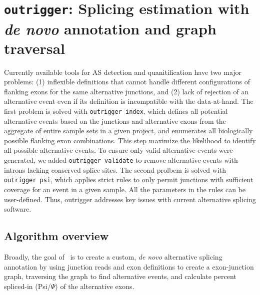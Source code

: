 \section{\texttt{outrigger}: Splicing estimation with \emph{de novo} annotation and graph traversal}
\label{sec:outrigger}

Currently available tools for AS detection and quanitification have two major problems: (1) inflexible definitions that cannot handle different configurations of flanking exons for the same alternative junctions, and (2) lack of rejection of an alternative event even if its definition is incompatible with the data-at-hand. The first problem is solved with \texttt{outrigger index}, which defines all potential alternative events based on the junctions and alternative exons from the aggregate of entire sample sets in a given project, and enumerates all biologically possible flanking exon combinations. This step maximize the likelihood to identify all possible alternative events. To ensure only valid alternative events were generated, we added \texttt{outrigger validate} to remove alternative events with introns lacking conserved splice sites. The second prolbem is solved with \texttt{outrigger psi}, which applies strict rules to only permit junctions with sufficient coverage for an event in a given sample. All the parameters in the rules can be user-defined. Thus, outrigger addresses key issues with current alternative splicing software.

\subsection{Algorithm overview}

Broadly, the goal of \outrigger\, is to create a custom, \emph{de novo} alternative splicing annotation by using junction reads and exon definitions to create a exon-junction graph, traversing the graph to find alternative events, and calculate percent spliced-in (Psi/$\Psi$) of the alternative exons.



